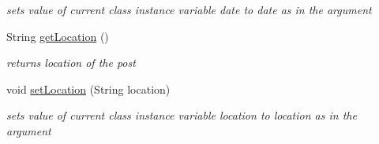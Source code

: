 \begin{DoxyCompactItemize}
\begin{DoxyCompactList}\small\item\em sets value of current class instance variable date to date as in the argument \end{DoxyCompactList}\item 
\hypertarget{classcom_1_1example_1_1sel_1_1lostfound_1_1UserPost_abc31b1e4f605f048c49e788daeee7a9b}{\-String \hyperlink{classcom_1_1example_1_1sel_1_1lostfound_1_1UserPost_abc31b1e4f605f048c49e788daeee7a9b}{get\-Location} ()}\label{classcom_1_1example_1_1sel_1_1lostfound_1_1UserPost_abc31b1e4f605f048c49e788daeee7a9b}

\begin{DoxyCompactList}\small\item\em returns location of the post \end{DoxyCompactList}\item 
\hypertarget{classcom_1_1example_1_1sel_1_1lostfound_1_1UserPost_adc028951513a63d36a2308ee2197117a}{void \hyperlink{classcom_1_1example_1_1sel_1_1lostfound_1_1UserPost_adc028951513a63d36a2308ee2197117a}{set\-Location} (\-String location)}\label{classcom_1_1example_1_1sel_1_1lostfound_1_1UserPost_adc028951513a63d36a2308ee2197117a}

\begin{DoxyCompactList}\small\item\em sets value of current class instance variable location to location as in the argument \end{DoxyCompactList}\end{DoxyCompactItemize}


